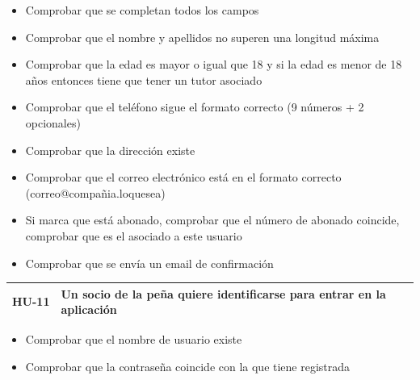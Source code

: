 \documentclass[11pt]{article}
\begin{document}
\begin{itemize}
	\item  Comprobar que se completan todos los campos
	\item  Comprobar que el nombre y apellidos no superen una longitud máxima
	\item  Comprobar que la edad es mayor o igual que 18 y si la edad es menor de 18 años entonces tiene que tener un tutor asociado
	\item Comprobar que el teléfono sigue el formato correcto (9 números + 2 opcionales)
	\item  Comprobar que la dirección existe 
	\item  Comprobar que el correo electrónico está en el formato correcto (correo@compañia.loquesea)
	\item  Si marca que está abonado, comprobar que el número de abonado coincide, comprobar que es el asociado a este usuario
	\item  Comprobar que se envía un email de confirmación
\end{itemize}

\begin{longtable}{p{0.12\linewidth}p{0.88\linewidth}}
	\toprule
	\textbf{HU-11} & Un socio de la peña quiere identificarse para entrar en la aplicación \\
	\bottomrule
\end{longtable}

\begin{itemize}
	\item Comprobar que el nombre de usuario existe 
	\item Comprobar que la contraseña coincide con la que tiene registrada
\end{itemize}
\end{document}

